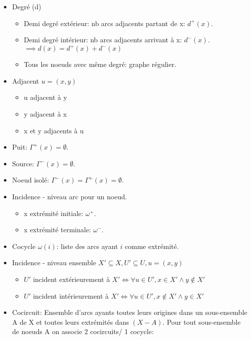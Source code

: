 \documentclass[10pt,landscape]{article}
\begin{document}
\begin{multicols}{3}
\begin{itemize}
      \item Degré (d)
        \begin{itemize}
          \item Demi degré extérieur: nb arcs adjacents partant de x: $d^{+}(x)$.
          \item Demi degré intérieur: nb arcs adjacents arrivant à x: $d^{-}(x)$.
            $\implies d(x) = d^{+}(x) + d^{-}(x)$
          \item Tous les noeuds avec même degré: graphe régulier.
        \end{itemize}
      \item Adjacent
        $ u = (x, y)$
        \begin{itemize}
          \item u adjacent à y
          \item y adjacent à x
          \item x et y adjacents à u
        \end{itemize}
      \item Puit: $\Gamma^{+}(x) = \emptyset$.
      \item Source: $\Gamma^{-}(x) = \emptyset$.
      \item Noeud isolé: $\Gamma^{-}(x) = \Gamma^{+}(x) = \emptyset$.
      \item Incidence - niveau arc pour un noeud.
        \begin{itemize}
          \item x extrémité initiale: $\omega^{+}$.
          \item x extrémité terminale: $\omega^{-}$.
        \end{itemize}
      \item Cocycle $\omega(i)$: liste des arcs ayant $i$ comme extrémité.
      \item Incidence - niveau ensemble
        $X' \subseteq X, U' \subseteq U, u = (x, y)$
        \begin{itemize}
          \item $U'$ incident extérieurement à $X' \iff \forall u \in U', x \in X' \land y \notin X'$
          \item $U'$ incident intérieurement à $X' \iff \forall u \in U', x \notin X' \land y \in X'$
        \end{itemize}
      \item Cocircuit: Ensemble d'arcs ayants toutes leurs origines dans un sous-ensemble A de X et toutes leurs extrémités dans $(X-A)$.
        Pour tout sous-ensemble de noeuds A on associe 2 cocircuits/ 1 cocycle:

\end{itemize}
\end{multicols}
\end{document}

